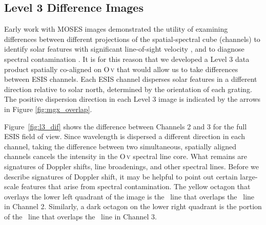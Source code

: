 		
	   
    \subsection{Level 3 Difference Images} \label{sec:dif_images} 
    	Early work with MOSES images demonstrated the utility of examining differences between different projections of the spatial-spectral cube (channels) to identify solar features with significant line-of-sight velocity \citep{Fox10,FoxPhD,RustPhD,Rust2019}, and to diagnose spectral contamination \citep{RustPhD, Rust2019}.
    	It is for this reason that we developed a Level 3 data product spatially co-aligned on O\,\textsc{v} %
    	that would allow us to take differences between ESIS channels.
    	Each ESIS channel disperses solar features in a different direction relative to solar north, determined by the orientation of each grating.
    	The positive dispersion direction in each Level 3 image is indicated by the arrows  in Figure \ref{fig:mgx_overlap}.
    	
    	Figure~\ref{fig:l3_dif} shows the difference between Channels 2 and 3 for the full ESIS field of view.  
    	Since wavelength is dispersed a different direction in each channel, taking the difference between two
    	simultaneous, spatially aligned channels cancels the intensity in the O\,\textsc{v} spectral line core. 
    	What remains are signatures of Doppler shifts, line broadenings, and other spectral lines.
    	Before we describe signatures of Doppler shift, it may be helpful to point out certain large-scale features that arise from spectral contamination.
    	The %
    	yellow octagon that overlays the lower left quadrant of the image is the \mgxbright \ line that overlaps the \ov \ line in Channel 2. Similarly, a dark octagon on the lower right quadrant is the portion of the \mgxbright \ line that overlaps the \ov \ line in Channel 3.
    	
